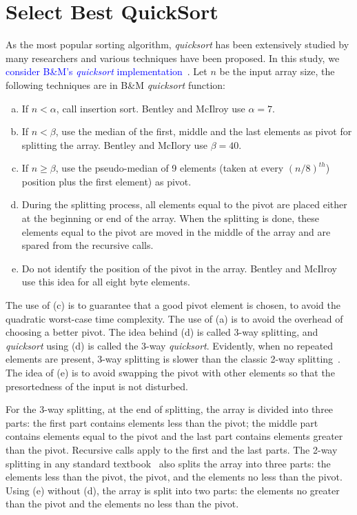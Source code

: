 \documentclass[AMA,STIX1COL]{WileyNJD-v2}
\newcommand{\qusort}{\emph{quicksort }}
\newcommand{\qusortn}{\emph{quicksort}}
\begin{document}
\section{Select Best QuickSort}       
As the most popular sorting algorithm, \qusort has been extensively studied by many researchers and various techniques have been proposed. 
In this study, we \textcolor{blue}{consider B\&M’s \qusort implementation~\cite{bentley1993engineering}}. 
Let $n$ be the input array size, the following techniques are in B\&M \qusort function: 

\begin{enumerate}[(a)]
\item If $n < \alpha$, call insertion sort. Bentley and McIlroy use $\alpha = 7$.
\item If $n < \beta$, use the median of the first, middle and the last elements as pivot for splitting the array. Bentley and McIlory use $\beta = 40$.
\item If $n \geq \beta$, use the pseudo-median of 9 elements (taken at every $(n/8)^{th}$) position plus the first element) as pivot.
\item During the splitting process, all elements equal to the pivot are placed either at the beginning or end of the array. When the splitting is done, these elements equal to the pivot are moved in the middle of the array and are spared from the recursive calls.
\item Do not identify the position of the pivot in the array. Bentley and McIlroy use this idea for all eight byte elements.
\end{enumerate}

The use of (c) is to guarantee that a good pivot element is chosen, to avoid the quadratic worst-case time complexity.  
The use of (a) is to avoid the overhead of choosing a better pivot. The idea behind (d) is called 3-way splitting, and \qusort using (d) is called the 3-way \qusortn. 
Evidently, when no repeated elements are present, 3-way splitting is slower than the classic 2-way splitting~\cite{10.5555/1614191}. 
The idea of (e) is to avoid swapping the pivot with other elements so that the presortedness of the input is not disturbed. 

For the 3-way splitting, at the end of splitting, the array is divided into three parts: the first part contains elements less than the pivot; the middle part contains elements equal to the pivot and the last part contains elements greater than the pivot. 
Recursive calls apply to the first and the last parts. 
The 2-way splitting in any standard textbook~\cite{10.5555/1614191} also splits the array into three parts: the elements less than the pivot, the pivot, and the elements no less than the pivot. 
Using (e) without (d), the array is split into two parts: the elements no greater than the pivot and the elements no less than the pivot. 
\end{document}

